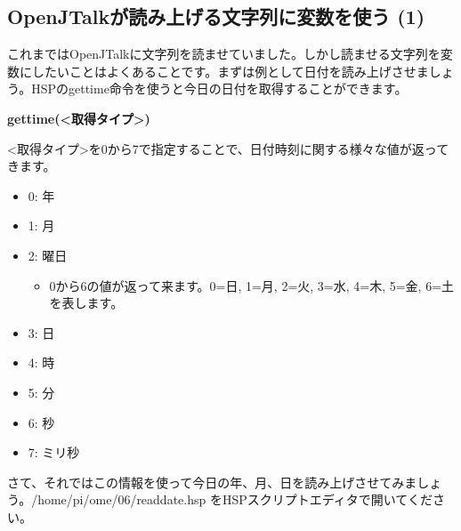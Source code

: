 \documentclass[a4paper,dvipdfmx]{jarticle}
\newcommand\liststyleLviii{%
\renewcommand\labelitemi{{\textbullet}}
\renewcommand\labelitemii{${\circ}$}
\renewcommand\labelitemiii{${\blacksquare}$}
\renewcommand\labelitemiv{{\textbullet}}
}
\begin{document}
\subsection{OpenJTalkが読み上げる文字列に変数を使う
(1)}
{
これまではOpenJTalkに文字列を読ませていました。しかし読ませる文字列を変数にしたいことはよくあることです。まずは例として日付を読み上げさせましょう。HSPのgettime命令を使うと今日の日付を取得することができます。}

{\ttfamily\bfseries
gettime({\textless}取得タイプ{\textgreater})}

{
{\textless}取得タイプ{\textgreater}を0から7で指定することで、日付時刻に関する様々な値が返ってきます。}

\liststyleLviii
\begin{itemize}
\item {
0: 年}
\item {
1: 月}
\item {
2: 曜日}

\begin{itemize}
\item {
0から6の値が返って来ます。0=日, 1=月, 2=火,
3=水, 4=木, 5=金, 6=土 を表します。}
\end{itemize}
\item {
3: 日}
\item {
4: 時}
\item {
5: 分}
\item {
6: 秒}
\item {
7: ミリ秒}
\end{itemize}
{
さて、それではこの情報を使って今日の年、月、日を読み上げさせてみましょう。/home/pi/ome/06/readdate.hsp
をHSPスクリプトエディタで開いてください。}
\end{document}
